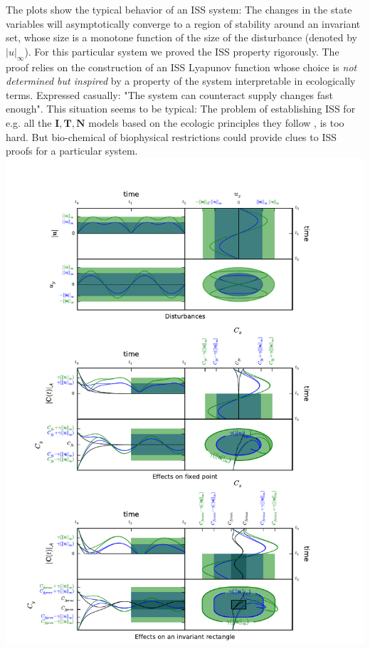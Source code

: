 \begin{minipage}[height=\columnheight]{\textwidth}
\begin{multicols*}{3}
The plots show the typical behavior of an ISS system: The changes in the state variables will asymptotically converge to a region of stability around an invariant set, whose size is a monotone function of the size of the disturbance (denoted by $|u|_{\infty}$).
For this particular system we proved the ISS property rigorously. The proof relies on the construction of an ISS Lyapunov function whose choice is \emph{not determined but  inspired} by a property of the system interpretable in ecologically terms. Expressed casually: "The  system can counteract supply changes fast enough".
This situation seems to be typical: The problem of establishing ISS for e.g. all the $\mathbf{I},\mathbf{T},\mathbf{N}$ models based on the ecologic principles they follow , is too hard.
But bio-chemical of biophysical restrictions could provide clues to ISS proofs for a particular system.
\\
\includegraphics[width=\columnwidth]{images/content/combiPlot2.pdf}

\end{multicols*}
\end{minipage}
